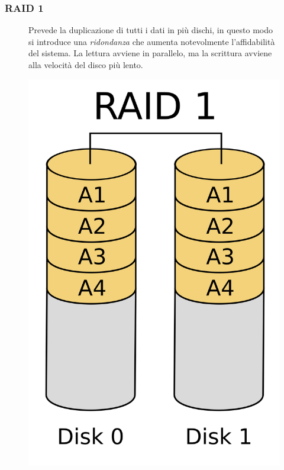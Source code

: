 \subsubsection*{RAID 1}
\begin{figure}[H]
    \centering
    \begin{minipage}{0.8\textwidth}
        Prevede la duplicazione di tutti i dati in più dischi, in questo modo si introduce una \textit{ridondanza} che aumenta notevolmente l'affidabilità del sistema.
        La lettura avviene in parallelo, ma la scrittura avviene alla velocità del disco più lento.

    \end{minipage}
    \hfill
    \begin{minipage}{0.15\textwidth}
        \centering
        \includegraphics[width=1\linewidth]{assets/RAID_1.png}
    \end{minipage}
\end{figure}

